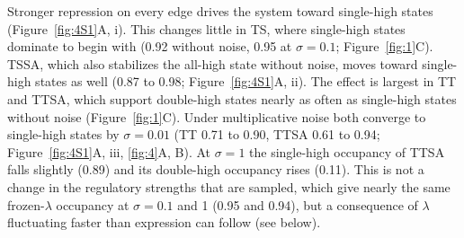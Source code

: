 \documentclass[11pt]{article}
\begin{document}
Stronger repression on every edge drives the system toward single-high states (Figure~\ref{fig:4S1}A, i). This changes little in TS, where single-high states dominate to begin with (0.92 without noise, 0.95 at $\sigma = 0.1$; Figure~\ref{fig:1}C). TSSA, which also stabilizes the all-high state without noise, moves toward single-high states as well (0.87 to 0.98; Figure~\ref{fig:4S1}A, ii). The effect is largest in TT and TTSA, which support double-high states nearly as often as single-high states without noise (Figure~\ref{fig:1}C). Under multiplicative noise both converge to single-high states by $\sigma = 0.01$ (TT 0.71 to 0.90, TTSA 0.61 to 0.94; Figure~\ref{fig:4S1}A, iii, \ref{fig:4}A, B). At $\sigma = 1$ the single-high occupancy of TTSA falls slightly (0.89) and its double-high occupancy rises (0.11). This is not a change in the regulatory strengths that are sampled, which give nearly the same frozen-$\lambda$ occupancy at $\sigma = 0.1$ and 1 (0.95 and 0.94), but a consequence of $\lambda$ fluctuating faster than expression can follow (see below).
\end{document}
